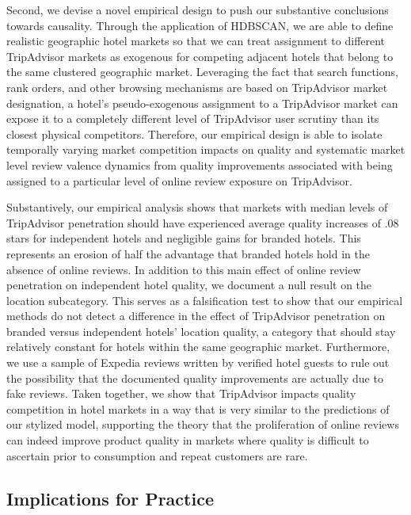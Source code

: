 \documentclass[mksc,blindrev]{informs3} %
\begin{document}
Second, we devise a novel empirical design to push our substantive conclusions towards causality. Through the application of HDBSCAN, we are able to define realistic geographic hotel markets so that we can treat assignment to different TripAdvisor markets as exogenous for competing adjacent hotels that belong to the same clustered geographic market. Leveraging the fact that search functions, rank orders, and other browsing mechanisms are based on TripAdvisor market designation, a hotel's pseudo-exogenous assignment to a TripAdvisor market can expose it to a completely different level of TripAdvisor user scrutiny than its closest physical competitors. Therefore, our empirical design is able to isolate temporally varying market competition impacts on quality and systematic market level review valence dynamics from quality improvements associated with being assigned to a particular level of online review exposure on TripAdvisor.

Substantively, our empirical analysis shows that markets with median levels of TripAdvisor penetration should have experienced average quality increases of .08 stars for independent hotels and negligible gains for branded hotels. This represents an erosion of half the advantage that branded hotels hold in the absence of online reviews. In addition to this main effect of online review penetration on independent hotel quality, we document a null result on the location subcategory. This serves as a falsification test to show that our empirical methods do not detect a difference in the effect of TripAdvisor penetration on branded versus independent hotels' location quality, a category that should stay relatively constant for hotels within the same geographic market. Furthermore, we use a sample of Expedia reviews written by verified hotel guests to rule out the possibility that the documented quality improvements are actually due to fake reviews. Taken together, we show that TripAdvisor impacts quality competition in hotel markets in a way that is very similar to the predictions of our stylized model, supporting the theory that the proliferation of online reviews can indeed improve product quality in markets where quality is difficult to ascertain prior to consumption and repeat customers are rare. 

\subsection{Implications for Practice}
\end{document}
